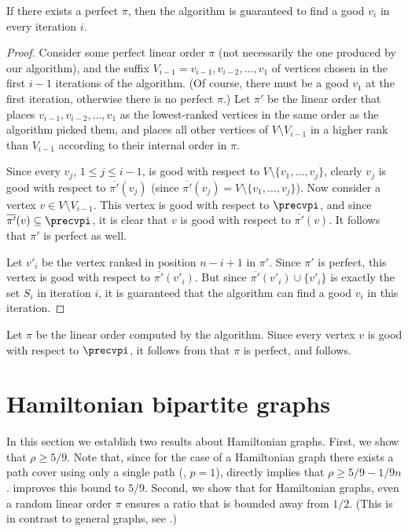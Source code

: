\begin{lemma}
	If there exists a perfect $\pi$, then the algorithm is guaranteed to find a good $v_i$ in every iteration $i$.
\end{lemma}
\begin{proof}
	Consider some perfect linear order $\pi$ (not necessarily the one produced by our algorithm), and the suffix $V_{i-1}=v_{i-1},v_{i-2},\ldots,v_1$ of vertices chosen in the first $i-1$ iterations of the
algorithm. %
(Of course, there must be a good $v_1$ at the first iteration, otherwise there is no perfect $\pi$.)  %
 Let $\pi'$ be the linear order that places $v_{i-1},v_{i-2},\ldots,v_1$ as the lowest-ranked %
vertices in the same order as the algorithm picked them, and places all other vertices of $V\setminus V_{i-1}$ in a higher rank than $V_{i-1}$ according to their internal order in $\pi$.
	
Since every $v_j$, $1\leq j\leq i-1$, is good with respect to $V\setminus \{v_1,\ldots, v_{j}\}$, %
clearly $v_j$ is good with respect to $\overline{\pi'}(v_j)$ (since $\overline{\pi'}(v_j) = V\setminus \{v_1,\ldots, v_{j}\}$). Now consider a vertex $v\in V\setminus V_{i-1}$. This vertex is good with respect to $\precvpi$, and since $\overline{\pi'}(v)\subseteq  \precvpi$, it is clear that $v$ is good with respect to $\overline{\pi'}(v)$. It follows that $\pi'$ is perfect as well.
	
	Let $v'_{i}$ be the vertex ranked in position $n-i+1$ in $\pi'$. Since $\pi'$ is perfect, this vertex is good with respect to $\overline{\pi'}(v'_i)$. But since $\overline{\pi'}(v'_i)\cup \{v'_{i}\}$ is exactly the set $S_i$ in iteration $i$, it is guaranteed that the algorithm can find a good $v_i$ in this iteration.
\end{proof}

Let $\pi$ be the linear order computed by the algorithm. Since every vertex $v$ is good with respect to $\precvpi$, it follows from  that $\pi$ is perfect, and  follows. 


\section{Hamiltonian bipartite graphs}
\label{sec:hamiltonian}

In this section we establish two results about Hamiltonian graphs.
First, we show that %
$\rho \ge 5/9$.   %
Note that, since for the case of a Hamiltonian graph there exists a path cover using only a single path
%
(\ie, $p=1$),  directly implies that 
%
$\rho \ge 5/9 - 1/9n$.
 improves this bound to $5/9$.
Second, we show that for Hamiltonian graphs, even a random linear order $\pi$ ensures a ratio that is bounded away from %
$1/2$.  %
(This is in contrast to general graphs, see .) %

